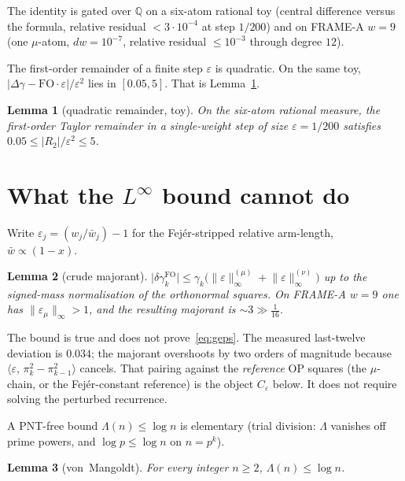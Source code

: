 \documentclass[11pt]{article}
\newtheorem{lemma}{Lemma}
\theoremstyle{remark}
\newcommand{\Q}{\mathbb{Q}}
\begin{document}
The identity is gated over $\Q$ on a six-atom rational toy
(central difference versus the formula, relative residual
$<3\cdot 10^{-4}$ at step $1/200$) and on FRAME-A $w=9$
(one $\mu$-atom, $dw=10^{-7}$, relative residual $\le 10^{-3}$
through degree $12$).

The first-order remainder of a finite step $\varepsilon$ is
quadratic.  On the same toy, $\lvert\Delta\gamma-\mathrm{FO}\cdot\varepsilon\rvert/\varepsilon^2$
lies in $[0.05,5]$.  That is Lemma~\ref{lem:r2toy}.

\begin{lemma}[quadratic remainder, toy]\label{lem:r2toy}
On the six-atom rational measure, the first-order Taylor remainder
in a single-weight step of size $\varepsilon=1/200$ satisfies
$0.05\le\lvert R_2\rvert/\varepsilon^2\le 5$.
\end{lemma}

\section{What the $L^\infty$ bound cannot do}\label{sec:linf}

Write $\varepsilon_j=(w_j/\bar w_j)-1$ for the Fej\'er-stripped
relative arm-length, $\bar w\propto(1-x)$.

\begin{lemma}[crude majorant]\label{lem:linf}
$\lvert\delta\gamma_k^{\mathrm{FO}}\rvert
\le\gamma_k\bigl(\lVert\varepsilon\rVert_\infty^{(\mu)}
+\lVert\varepsilon\rVert_\infty^{(\nu)}\bigr)$
up to the signed-mass normalisation of the orthonormal squares.
On FRAME-A $w=9$ one has $\lVert\varepsilon_\mu\rVert_\infty>1$,
and the resulting majorant is $\sim 3\gg\tfrac1{16}$.
\end{lemma}

The bound is true and does not prove~\eqref{eq:geps}.
The measured last-twelve deviation is $0.034$; the majorant overshoots
by two orders of magnitude because
$\langle\varepsilon,\,\pi_k^2-\pi_{k-1}^2\rangle$ cancels.
That pairing against the \emph{reference} OP squares (the $\mu$-chain,
or the Fej\'er-constant reference) is the object $C_\varepsilon$ below.
It does not require solving the perturbed recurrence.

A PNT-free bound $\Lambda(n)\le\log n$ is elementary
(trial division: $\Lambda$ vanishes off prime powers, and
$\log p\le\log n$ on $n=p^k$).

\begin{lemma}[von~Mangoldt]\label{lem:lambda}
For every integer $n\ge 2$, $\Lambda(n)\le\log n$.
\end{lemma}
\end{document}
